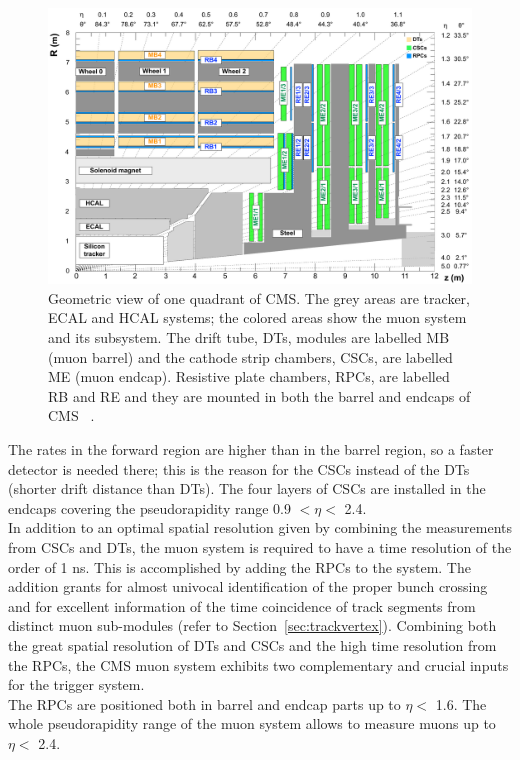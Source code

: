 \begin{figure}[h!]
\centering
\includegraphics[width=0.999\textwidth]{Figures/c2/cms_quadrant_run_ii.pdf}
\caption{Geometric view of one quadrant of CMS. The grey areas are
  tracker, ECAL and HCAL systems; the colored
  areas show the muon system and its subsystem. The drift tube, DTs,
  modules are labelled MB (muon barrel) and the cathode strip
  chambers, CSCs, are labelled ME (muon endcap). Resistive plate
  chambers, RPCs, are labelled RB and RE and they are mounted in both the barrel and endcaps of CMS
~\cite{muonsystemPU}. }
\label{fig:muonsystem}
\end{figure} 

The rates in the forward region are higher than in the
barrel region, so a faster detector is needed there; this is the
reason for the CSCs instead of the DTs (shorter drift distance than DTs).
The four layers of
CSCs are installed in the endcaps covering the pseudorapidity range 0.9
$<\eta<$ 2.4. \\
In addition to an optimal spatial resolution given by combining the
measurements from CSCs and DTs, the muon system is required to have a time resolution of
the order of 1 ns. This is accomplished by adding the RPCs to the
system. The addition grants for almost univocal identification of the proper bunch
crossing and for excellent information of the time coincidence of track
segments from distinct
muon sub-modules (refer to Section~\ref{sec:trackvertex}). 
Combining both the great spatial resolution of DTs and CSCs and the
high time resolution from the RPCs,
 the CMS muon system exhibits two
complementary and crucial inputs for the trigger system. \\
The RPCs are positioned both in barrel
and endcap parts up to $\eta<$ 1.6. The whole pseudorapidity range of
the muon system allows to measure muons up to $\eta<$ 2.4.


